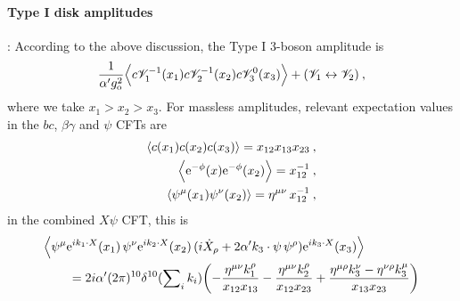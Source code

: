 \paragraph*{Type I disk amplitudes}: According to the above discussion, the Type I 3-boson amplitude is
\begin{equation}
	\frac{1}{\alpha^{\prime}g_{\mathrm{o}}^{2}}\Bigl\langle c\mathscr{V}_{1}^{-1}(x_{1})c\mathscr{V}^{-1}_{2}(x_{2})
	c\mathscr{V}_{3}^{0}(x_{3}) \Bigr\rangle + (\mathscr{V}_{1}\leftrightarrow\mathscr{V}_{2})\:, \label{12.4.1}
\end{equation}
where we take $x_{1}>x_{2}>x_{3}$. For massless amplitudes, relevant expectation values in the $bc$, $\beta\gamma$ and $\psi$ CFTs are
\begin{subequations}
	\begin{align}
		\langle c(x_{1})c(x_{2})c(x_{3})\rangle =x_{12}x_{13}x_{23} \:, \label{12.4.2a} \\
		\Bigl\langle \mathrm{e}^{-\phi}(x)\mathrm{e}^{-\phi}(x_{2})\Bigr\rangle = x_{12}^{-1} \:, \label{12.4.2b} \\
		\langle \psi^{\mu}(x_{1})\psi^{\nu}(x_{2})\rangle =\eta^{\mu\nu}\,x_{12}^{-1} \:, \label{12.4.2c}
	\end{align} \label{12.4.2}
\end{subequations}
in the combined $X\psi$ CFT, this is
\begin{align}
	&\Bigl\langle \psi^{\mu}\mathrm{e}^{i k_{1}\cdot X}(x_{1})\,\psi^{\nu}\mathrm{e}^{i k_{2}\cdot X}(x_{2})\,
	(i \dot{X}_{\rho}+2\alpha^{\prime}k_{3}\cdot\psi\,\psi^{\rho})\mathrm{e}^{i k_{3}\cdot X}(x_{3})\Bigr\rangle \nonumber\\
	&\qquad=2i\alpha^{\prime}(2\pi)^{10}\delta^{10}(\sum\nolimits_{i}k_{i})
	\biggl(-\frac{\eta^{\mu\nu}k_{1}^{\rho}}{x_{12}x_{13}}-\frac{\eta^{\mu\nu}k_{2}^{\rho}}{x_{12}x_{23}}
	+\frac{\eta^{\mu\rho}k_{3}^{\nu}-\eta^{\nu\rho}k_{3}^{\mu}}{x_{13}x_{23}}\biggr) \label{12.4.3}
\end{align}
